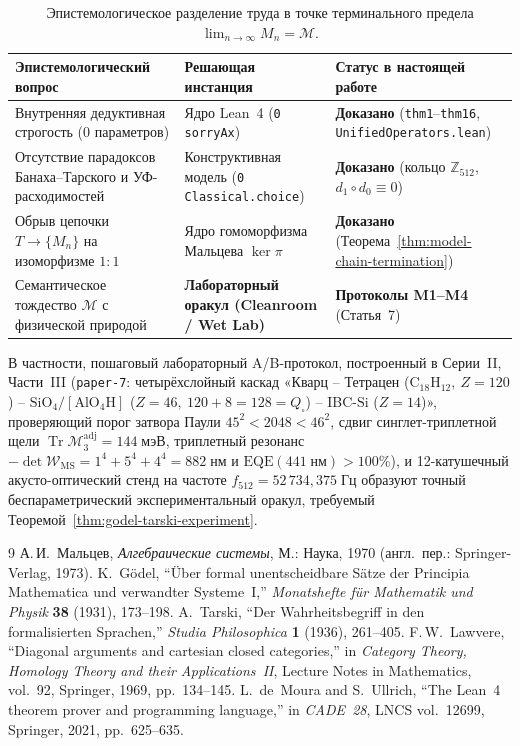 \documentclass[11pt,a4paper]{article}
\theoremstyle{definition}
\theoremstyle{remark}
\begin{document}
\begin{table}[htbp]
\centering
\caption{Эпистемологическое разделение труда в точке терминального предела $\lim_{n\to\infty} M_n = \mathcal{M}$.}
\label{tab:epistemological-division}
\small
\begin{tabular}{@{}lll@{}}
\toprule
\textbf{Эпистемологический вопрос} & \textbf{Решающая инстанция} & \textbf{Статус в настоящей работе} \\
\midrule
Внутренняя дедуктивная строгость ($0$ параметров) & Ядро Lean~4 (\texttt{0 sorryAx}) & \textbf{Доказано} (\texttt{thm1}--\texttt{thm16}, \texttt{UnifiedOperators.lean}) \\
Отсутствие парадоксов Банаха--Тарского и УФ-расходимостей & Конструктивная модель (\texttt{0 Classical.choice}) & \textbf{Доказано} (кольцо $\mathbb{Z}_{512}$, $d_1\circ d_0\equiv 0$) \\
Обрыв цепочки $T\to\{M_n\}$ на изоморфизме $1:1$ & Ядро гомоморфизма Мальцева $\ker\pi$ & \textbf{Доказано} (Теорема~\ref{thm:model-chain-termination}) \\
Семантическое тождество $\mathcal{M}$ с физической природой & \textbf{Лабораторный оракул (Cleanroom / Wet Lab)} & \textbf{Протоколы M1--M4} (Статья~7) \\
\bottomrule
\end{tabular}
\end{table}

В частности, пошаговый лабораторный A/B-протокол, построенный в Серии~II, Части~III (\texttt{paper-7}: четырёхслойный каскад «Кварц -- Тетрацен ($\mathrm{C_{18}H_{12}},\ Z=120$) -- $\mathrm{SiO_4}/[\mathrm{AlO_4H}]$ ($Z=46,\ 120+8=128=Q_\square$) -- IBC-$\mathrm{Si}$ ($Z=14$)», проверяющий порог затвора Паули $45^2 < 2048 < 46^2$, сдвиг синглет-триплетной щели $\operatorname{Tr}\mathcal{M}_3^{\mathrm{adj}} = 144\;\text{мэВ}$, триплетный резонанс $-\det\mathcal{W}_{\mathrm{MS}} = 1^4+5^4+4^4 = 882\;\text{нм}$ и $\mathrm{EQE}(441\;\text{нм}) > 100\%$), и 12-катушечный акусто-оптический стенд на частоте $f_{512} = 52\,734{,}375\;\text{Гц}$ образуют точный беспараметрический экспериментальный оракул, требуемый Теоремой~\ref{thm:godel-tarski-experiment}.

\begin{thebibliography}{9}
А.\,И.~Мальцев, \emph{Алгебраические системы}, М.: Наука, 1970 (англ.\ пер.: Springer-Verlag, 1973).
K.~G\"odel, ``\"Uber formal unentscheidbare S\"atze der Principia Mathematica und verwandter Systeme~I,'' \emph{Monatshefte f\"ur Mathematik und Physik} \textbf{38} (1931), 173--198.
A.~Tarski, ``Der Wahrheitsbegriff in den formalisierten Sprachen,'' \emph{Studia Philosophica} \textbf{1} (1936), 261--405.
F.\,W.~Lawvere, ``Diagonal arguments and cartesian closed categories,'' in \emph{Category Theory, Homology Theory and their Applications~II}, Lecture Notes in Mathematics, vol.~92, Springer, 1969, pp.~134--145.
L.~de~Moura and S.~Ullrich, ``The Lean~4 theorem prover and programming language,'' in \emph{CADE~28}, LNCS vol.~12699, Springer, 2021, pp.~625--635.
\end{thebibliography}
\end{document}
